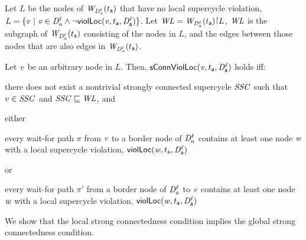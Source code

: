 \begin{definition}
\label{def:sConn.violation.loc}
\label{defn:sConn.violation.loc}

Let $L$ be the nodes of $\mathit{W}_{\mathit{D}_{a}^{\ell}}({t_{\mathsf{a}}})$ that have no local supercycle violation, \ie
 $L = \{  \mathit{v} ~|~ \mathit{v} \in \mathit{D}_{a}^{\ell} \land \neg \mathsf{violLoc}(\mathit{v},t_{\mathsf{a}},\mathit{D}_{\mathsf{a}}^{\ell})  \}$.
%
Let $\WL = \wfg{\dsk{a}{\l}}{t_\act} \pj L$, \ie $\mathit{WL}$ is the subgraph of $\mathit{W}_{\mathit{D}_{a}^{\ell}}({t_{\mathsf{a}}})$ consisting of the
nodes in $L$, and the edges between those nodes that are also edges in $\mathit{W}_{\mathit{D}_{a}^{\ell}}({t_{\mathsf{a}}})$.

Let $\mathit{v}$ be an arbitrary node in $L$.  Then, $\mathsf{sConnViolLoc}(\mathit{v},t_{\mathsf{a}},\mathit{D}_{\mathsf{a}}^{\ell})$ holds iff:
\bn

\item \label{def:sConn.violation.loc:scc}
there does not exist a nontrivial strongly connected supercycle $\mathit{SSC}$ such that $v \in \mathit{SSC}$ and $\mathit{SSC} \sqsubseteq \mathit{WL}$, and


\item \label{def:sConn.violation.border}
either
    \bn

    \item \label{def:sConn.violation.loc:wait-for-out} every wait-for path $\pi$ from $\mathit{v}$ to a border node
      of $\mathit{D}_{a}^{\ell}$ contains at least one node $\mathit{w}$ with a local supercycle violation, \ie $\mathsf{violLoc}(\mathit{w},t_{\mathsf{a}},\mathit{D}_{\mathsf{a}}^{\ell})$

     or

    \item \label{def:sConn.violation.loc:wait-for-in} every wait-for path $\pi'$ from a border node
      of $\mathit{D}_{a}^{\ell}$ to $\mathit{v}$ contains at least one node $\mathit{w}$ with a
      local supercycle violation,  \ie $\mathsf{violLoc}(\mathit{w},t_{\mathsf{a}},\mathit{D}_{\mathsf{a}}^{\ell})$

    \en

\en
\end{definition}


We show that the local strong connectedness condition implies the global strong connectedness condition.


